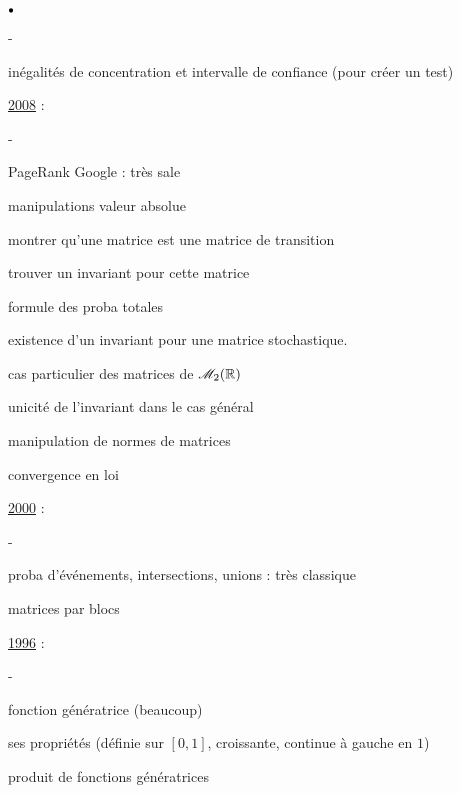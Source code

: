 \documentclass[11pt]{book}%
\begin{document}
\begin{noliste}{$\scriptstyle \bullet$}
\begin{noliste}{-}
  \item inégalités de concentration et intervalle de confiance (pour 
  créer un test)
 \end{noliste}
 
\item \underline{2008} :
 \begin{noliste}{-}
  \item PageRank Google : très sale
  
  \item manipulations valeur absolue
  
  \item montrer qu'une matrice est une matrice de transition
  
  \item trouver un invariant pour cette matrice
  
  \item formule des proba totales
  
  \item existence d'un invariant pour une matrice stochastique.
  
  \item cas particulier des matrices de $\mathscr{M}_{2}(\mathbb{R})$
  
  \item unicité de l'invariant dans le cas général
  
  \item manipulation de normes de matrices
  
  \item convergence en loi
 \end{noliste}
 
 \newpage
 
\item \underline{2000} :
 \begin{noliste}{-}
  \item proba d'événements, intersections, unions : très classique
  
  \item matrices par blocs
 \end{noliste}
 
\item \underline{1996} :
 \begin{noliste}{-}
  \item fonction génératrice (beaucoup)
  
  \item ses propriétés (définie sur $[0,1]$, croissante, continue à 
  gauche en $1$)
  
  \item produit de fonctions génératrices
  

\end{noliste}
\end{noliste}
\end{document}
